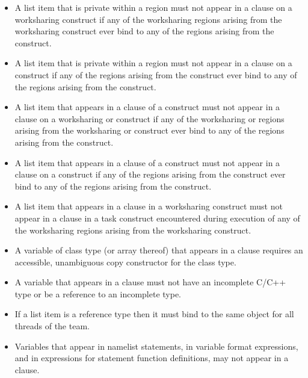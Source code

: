 \begin{itemize}
\item A list item that is private within a  region must not appear in a 
 clause on a worksharing construct if any of the worksharing 
regions arising from the worksharing construct ever bind to any of the  
regions arising from the  construct. 

\item A list item that is private within a  region must not appear in a 
 clause on a  construct if any of the  
regions arising from the  construct ever bind to any of the  
regions arising from the  construct.

\item A list item that appears in a  clause of a  construct must not 
appear in a  clause on a worksharing or  construct if any of 
the worksharing or  regions arising from the worksharing or  construct 
ever bind to any of the  regions arising from the  construct.

\item A list item that appears in a  clause of a  construct must not 
appear in a  clause on a  construct if any of the 
 regions arising from the  construct ever bind to any of 
the  regions arising from the  construct. 

\item A list item that appears in a  clause in a worksharing construct must not 
appear in a  clause in a task construct encountered during execution 
of any of the worksharing regions arising from the worksharing construct.

\cppspecificstart
\item A variable of class type (or array thereof) that appears in a  clause 
requires an accessible, unambiguous copy constructor for the class type.
\cppspecificend

\ccppspecificstart
\item A variable that appears in a  clause must not have an incomplete C/C++ type or be a reference to an incomplete type.
\item If a list item is a reference type then it must bind to the same object for all threads of the team.
\ccppspecificend

\fortranspecificstart
\item Variables that appear in namelist statements, in variable format expressions, and in 
expressions for statement function definitions, may not appear in a  
clause. 
\fortranspecificend
\end{itemize}










